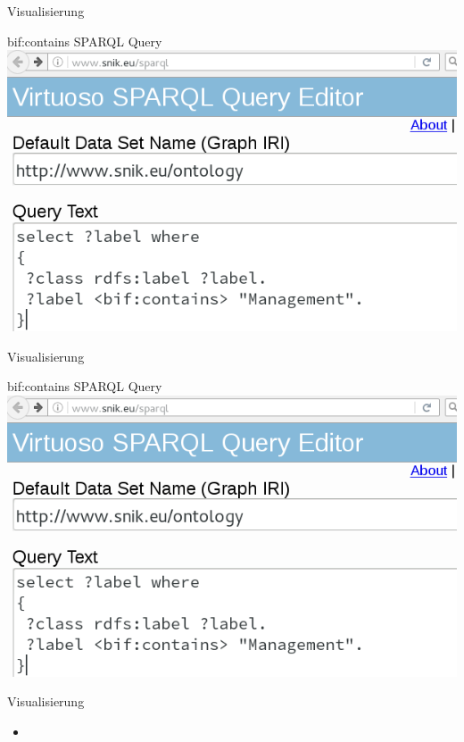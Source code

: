 \documentclass[14pt,aspectratio=1610]{beamer}
\begin{document}
\begin{frame}{Visualisierung}
\begin{block}{bif:contains SPARQL Query}
\centering\includegraphics[width=\textwidth,height=0.7\textheight,keepaspectratio]{img/bifcontains-query.png}
\end{block}
\end{frame}

\begin{frame}{Visualisierung}
\begin{block}{bif:contains SPARQL Query}
\centering\includegraphics[width=\textwidth,height=0.7\textheight,keepaspectratio]{img/bifcontains-query.png}
\end{block}
\end{frame}



\begin{frame}{Visualisierung}
\begin{block}{}
\begin{itemize}
\item 
\end{itemize}
\end{block}
\end{frame}
\end{document}
